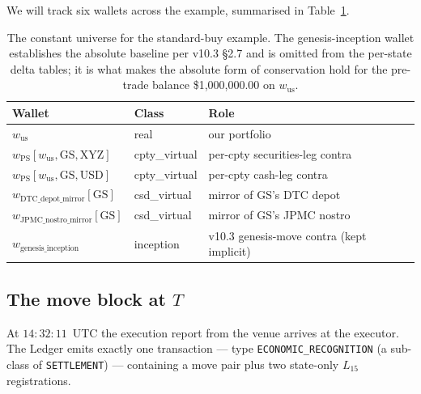 \documentclass[11pt,a4paper]{article}
\begin{document}
We will track six wallets across the example, summarised in Table~\ref{tab:buy-universe}.

\begin{table}[h]
\centering
\begin{tabular}{lll}
\toprule
\textbf{Wallet} & \textbf{Class} & \textbf{Role} \\
\midrule
$w_{\mathrm{us}}$ & real & our portfolio \\
$w_{\mathrm{PS}}[w_{\mathrm{us}}, \mathrm{GS}, \mathrm{XYZ}]$ & cpty\_virtual & per-cpty securities-leg contra \\
$w_{\mathrm{PS}}[w_{\mathrm{us}}, \mathrm{GS}, \mathrm{USD}]$ & cpty\_virtual & per-cpty cash-leg contra \\
$w_{\mathrm{DTC\_depot\_mirror}}[\mathrm{GS}]$ & csd\_virtual & mirror of GS's DTC depot \\
$w_{\mathrm{JPMC\_nostro\_mirror}}[\mathrm{GS}]$ & csd\_virtual & mirror of GS's JPMC nostro \\
$w_{\mathrm{genesis\_inception}}$ & inception & v10.3 genesis-move contra (kept implicit) \\
\bottomrule
\end{tabular}
\caption{The constant universe for the standard-buy example. The genesis-inception wallet establishes the absolute baseline per v10.3 \S2.7 and is omitted from the per-state delta tables; it is what makes the absolute form of conservation hold for the pre-trade balance \$1{,}000{,}000.00 on $w_{\mathrm{us}}$.}
\label{tab:buy-universe}
\end{table}

\subsection{The move block at $T$}
\label{sec:buy-T}

At $14{:}32{:}11$~UTC the execution report from the venue arrives at the executor. The Ledger emits exactly one transaction --- type \texttt{ECONOMIC\_RECOGNITION} (a sub-class of \texttt{SETTLEMENT}) --- containing a move pair plus two state-only $L_{15}$ registrations.
\end{document}
